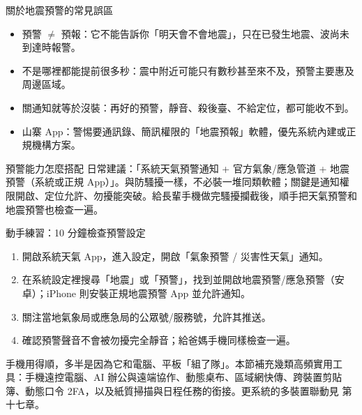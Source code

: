 \begin{tcbwarn}{關於地震預警的常見誤區}
\begin{itemize}
  \item 預警 $\neq$ 預報：它不能告訴你「明天會不會地震」，只在已發生地震、波尚未到達時報警。
  \item 不是哪裡都能提前很多秒：震中附近可能只有數秒甚至來不及，預警主要惠及周邊區域。
  \item 關通知就等於沒裝：再好的預警，靜音、殺後臺、不給定位，都可能收不到。
  \item 山寨 App：警惕要通訊錄、簡訊權限的「地震預報」軟體，優先系統內建或正規機構方案。
\end{itemize}

\end{tcbwarn}

\begin{tcbinfo}{預警能力怎麼搭配}
日常建議：「系統天氣預警通知 + 官方氣象/應急管道 + 地震預警（系統或正規 App）」。與防騷擾一樣，不必裝一堆同類軟體；關鍵是通知權限開啟、定位允許、勿擾能突破。給長輩手機做完騷擾攔截後，順手把天氣預警和地震預警也檢查一遍。

\end{tcbinfo}

\begin{tcbpractice}{動手練習：10 分鐘檢查預警設定}
\begin{enumerate}
  \item 開啟系統天氣 App，進入設定，開啟「氣象預警 / 災害性天氣」通知。
  \item 在系統設定裡搜尋「地震」或「預警」，找到並開啟地震預警/應急預警（安卓）；iPhone 則安裝正規地震預警 App 並允許通知。
  \item 關注當地氣象局或應急局的公眾號/服務號，允許其推送。
  \item 確認預警聲音不會被勿擾完全靜音；給爸媽手機同樣檢查一遍。
\end{enumerate}

\end{tcbpractice}


手機用得順，多半是因為它和電腦、平板「組了隊」。本節補充幾類高頻實用工具：手機遠控電腦、AI 辦公與遠端協作、動態桌布、區域網快傳、跨裝置剪貼簿、動態口令 2FA，以及紙質掃描與日程任務的銜接。更系統的多裝置聯動見 第十七章。


